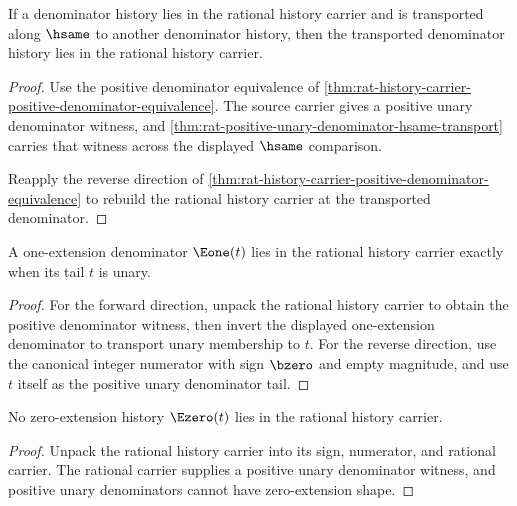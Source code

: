 \begin{theorem}
\label{thm:rat-history-carrier-hsame-transport}
If a denominator history lies in the rational history carrier and is transported
along $\hsame$ to another denominator history, then the transported denominator
history lies in the rational history carrier.
\end{theorem}
\begin{proof}
Use the positive denominator equivalence of
\autoref{thm:rat-history-carrier-positive-denominator-equivalence}. The source
carrier gives a positive unary denominator witness, and
\autoref{thm:rat-positive-unary-denominator-hsame-transport} carries that witness
across the displayed $\hsame$ comparison.

Reapply the reverse direction of
\autoref{thm:rat-history-carrier-positive-denominator-equivalence} to rebuild the
rational history carrier at the transported denominator.
\end{proof}

\begin{theorem}
\label{thm:rat-history-carrier-e1-tail-unary-iff}
A one-extension denominator \(\Eone(t)\) lies in the rational history carrier
exactly when its tail \(t\) is unary.
\end{theorem}
\begin{proof}
For the forward direction, unpack the rational history carrier to obtain the
positive denominator witness, then invert the displayed one-extension
denominator to transport unary membership to \(t\). For the reverse direction,
use the canonical integer numerator with sign \(\bzero\) and empty magnitude,
and use \(t\) itself as the positive unary denominator tail.
\end{proof}

\begin{theorem}
\label{thm:rat-history-carrier-e0-absurd}
No zero-extension history \(\Ezero(t)\) lies in the rational history carrier.
\end{theorem}
\begin{proof}
Unpack the rational history carrier into its sign, numerator, and rational
carrier. The rational carrier supplies a positive unary denominator witness,
and positive unary denominators cannot have zero-extension shape.
\end{proof}

